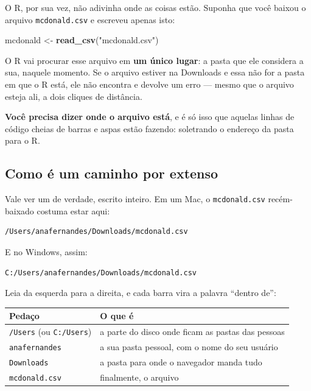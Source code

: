 \documentclass[
]{book}
\newenvironment{Shaded}{\begin{snugshade}}{\end{snugshade}}
\newcommand{\FunctionTok}[1]{\textcolor[rgb]{0.13,0.29,0.53}{\textbf{#1}}}
\newcommand{\NormalTok}[1]{#1}
\newcommand{\OtherTok}[1]{\textcolor[rgb]{0.56,0.35,0.01}{#1}}
\newcommand{\StringTok}[1]{\textcolor[rgb]{0.31,0.60,0.02}{#1}}
\newcounter{none} %
\begin{document}
O R, por sua vez, não adivinha onde as coisas estão. Suponha que você baixou o arquivo \texttt{mcdonald.csv} e escreveu apenas isto:

\begin{Shaded}
\begin{Highlighting}[]
\NormalTok{mcdonald }\OtherTok{\textless{}{-}} \FunctionTok{read\_csv}\NormalTok{(}\StringTok{"mcdonald.csv"}\NormalTok{)}
\end{Highlighting}
\end{Shaded}

O R vai procurar esse arquivo em \textbf{um único lugar}: a pasta que ele considera a sua, naquele momento. Se o arquivo estiver na Downloads e essa não for a pasta em que o R está, ele não encontra e devolve um erro --- mesmo que o arquivo esteja ali, a dois cliques de distância.

\textbf{Você precisa dizer onde o arquivo está}, e é só isso que aquelas linhas de código cheias de barras e aspas estão fazendo: soletrando o endereço da pasta para o R.

\subsection{Como é um caminho por extenso}\label{como-uxe9-um-caminho-por-extenso}

Vale ver um de verdade, escrito inteiro. Em um Mac, o \texttt{mcdonald.csv} recém-baixado costuma estar aqui:

\begin{verbatim}
/Users/anafernandes/Downloads/mcdonald.csv
\end{verbatim}

E no Windows, assim:

\begin{verbatim}
C:/Users/anafernandes/Downloads/mcdonald.csv
\end{verbatim}

Leia da esquerda para a direita, e cada barra vira a palavra ``dentro de'':

{\def\LTcaptype{none} %
\begin{longtable}[]{@{}
  >{\raggedright\arraybackslash}p{}
  >{\raggedright\arraybackslash}p{}@{}}
\toprule\noalign{}
\begin{minipage}[b]{\linewidth}\raggedright
Pedaço
\end{minipage} & \begin{minipage}[b]{\linewidth}\raggedright
O que é
\end{minipage} \\
\midrule\noalign{}
\endhead
\bottomrule\noalign{}
\endlastfoot
\texttt{/Users} (ou \texttt{C:/Users}) & a parte do disco onde ficam as pastas das pessoas \\
\texttt{anafernandes} & a sua pasta pessoal, com o nome do seu usuário \\
\texttt{Downloads} & a pasta para onde o navegador manda tudo \\
\texttt{mcdonald.csv} & finalmente, o arquivo \\
\end{longtable}
}
\end{document}
